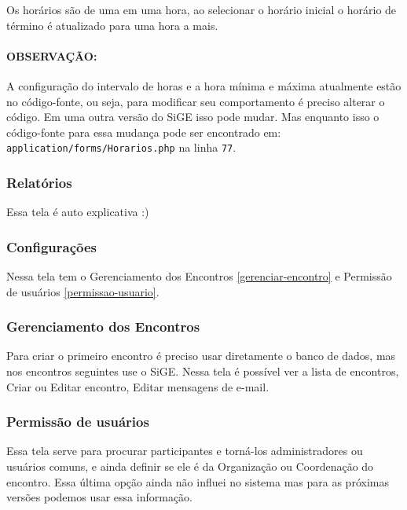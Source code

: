 Os horários são de uma em uma hora, ao selecionar o horário inicial o
horário de término é atualizado para uma hora a mais.

\paragraph{OBSERVAÇÃO:}

A configuração do intervalo de horas e a hora mínima e máxima atualmente
estão no código-fonte, ou seja, para modificar seu comportamento é
preciso alterar o código. Em uma outra versão do SiGE isso pode mudar.
Mas enquanto isso o código-fonte para essa mudança pode ser encontrado
em: \texttt{application/forms/Horarios.php} na linha \texttt{77}.

\subsubsection{Relatórios}

Essa tela é auto explicativa :)

\subsubsection{Configurações}

Nessa tela tem o Gerenciamento dos Encontros \ref{gerenciar-encontro} e
Permissão de usuários \ref{permissao-usuario}.

\subsubsection{Gerenciamento dos Encontros \label{gerenciar-encontro}}

Para criar o primeiro encontro é preciso usar diretamente o banco de
dados, mas nos encontros seguintes use o SiGE. Nessa tela é possível ver
a lista de encontros, Criar ou Editar encontro, Editar mensagens de
e-mail.

\subsubsection{Permissão de usuários \label{permissao-usuario}}

Essa tela serve para procurar participantes e torná-los administradores
ou usuários comuns, e ainda definir se ele é da Organização ou
Coordenação do encontro. Essa última opção ainda não influei no sistema
mas para as próximas versões podemos usar essa informação.
